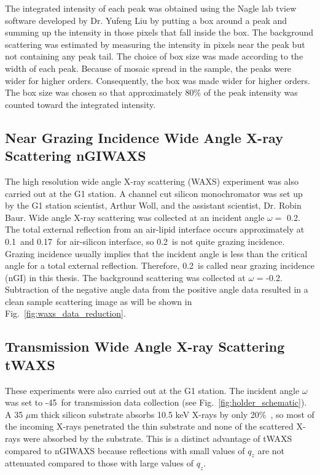 The integrated intensity of each peak was obtained using the Nagle lab tview
software developed by Dr. Yufeng Liu \cite{Liu03} by putting a box around a
peak and summing up the intensity in those pixels that fall inside the box.
The background scattering was estimated by measuring the intensity in pixels
near the peak but not containing any peak tail. The choice of box size was 
made according to the width of each peak. Because of mosaic spread in the sample,
the peaks were wider for higher orders. 
Consequently, the box was made wider for higher
orders. The box size was chosen so that approximately 80\% of the peak intensity
was counted toward the integrated intensity.

\subsection{Near Grazing Incidence Wide Angle X-ray Scattering nGIWAXS}\label{sec:nGIWAXS_method}
The high resolution wide angle X-ray scattering (WAXS)
experiment was also carried out at the G1 station. 
A channel cut silicon monochromator was set up by the G1
station scientist, Arthur Woll, and the assistant scientist, Dr. Robin Baur.
Wide angle X-ray scattering was collected at an incident angle $\omega=$ 
0.2\textdegree. 
The total external reflection from an air-lipid interface occurs approximately 
at 0.1\textdegree\ and 0.17\textdegree\ for air-silicon interface, 
so 0.2\textdegree\ is not quite grazing incidence.
Grazing incidence usually implies that the incident angle is less than the 
critical angle for a total external reflection.
Therefore, 0.2\textdegree\ is called near grazing incidence (nGI) in this thesis.
The background scattering was collected at $\omega$ = -0.2\textdegree. Subtraction
of the negative angle data from the positive angle data resulted in 
a clean sample scattering image as will be shown in 
Fig.~\ref{fig:waxs_data_reduction}.


\subsection{Transmission Wide Angle X-ray Scattering tWAXS}\label{sec:tWAXS_method}
These experiments were also carried out at the G1 station.
The incident angle $\omega$ was set to -45\textdegree\ for transmission data
collection (see Fig.~\ref{fig:holder_schematic}). 
A 35 $\mu$m thick silicon substrate absorbs 10.5 keV X-rays 
by only 20\%\ \cite{ref:cxro}, so most of the incoming X-rays penetrated
the thin substrate and none of the scattered X-rays were absorbed by the 
substrate.  This is a distinct advantage of tWAXS compared to nGIWAXS because 
reflections with small values of $q_z$ are not attenuated compared to those 
with large values of $q_z$.
 
